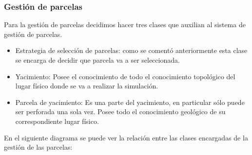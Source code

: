 \newpage

\subsubsection{Gestión de parcelas}
Para la gestión de parcelas decidimos hacer tres clases que auxilian al sistema de gestión de parcelas. 
\begin{itemize}
    \item Estrategia de selección de parcelas: como se comentó anteriormente esta clase se encarga de decidir que parcela va a ser seleccionada.
    \item Yacimiento: Posee el conocimiento de todo el conocimiento topológico del lugar físico donde se va a realizar la simulación.
    \item Parcela de yacimiento: Es una parte del yacimiento, en particular sólo puede ser perforada una sola vez. Posee todo el conocimiento geológico de su correspondiente lugar físico.
\end{itemize}
En el siguiente diagrama se puede ver la relaci\'on entre las clases encargadas de la gesti\'on de las parcelas:\\


